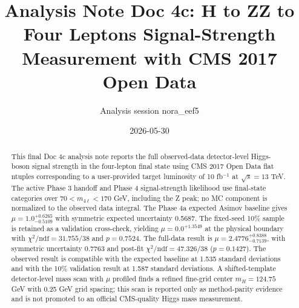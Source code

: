 \documentclass[11pt]{article}
\title{Analysis Note Doc 4c: H to ZZ to Four Leptons Signal-Strength Measurement with CMS 2017 Open Data}
\author{Analysis session nora\_eef5}
\date{2026-05-30}
\begin{document}
\maketitle
\begin{abstract}
This final Doc 4c analysis note reports the full observed-data detector-level Higgs-boson signal strength in the four-lepton final state using CMS 2017 Open Data flat ntuples corresponding to a user-provided target luminosity of 10 fb$^{-1}$ at $\sqrt{s}=13$ TeV.
The active Phase 3 handoff and Phase 4 signal-strength likelihood use final-state categories over $70 < m_{4\ell} < 170$ GeV, including the Z peak; no MC component is normalized to the observed data integral.
The Phase 4a expected Asimov baseline gives $\mu=1.0^{+0.6265}_{-0.5109}$ with symmetric expected uncertainty 0.5687.
The fixed-seed 10\% sample is retained as a validation cross-check, yielding $\mu=0.0^{+1.3549}$ at the physical boundary with $\chi^2/\mathrm{ndf}=31.755/38$ and $p=0.7524$.
The full-data result is $\mu=2.4776^{+0.8388}_{-0.7139}$, with symmetric uncertainty 0.7763 and post-fit $\chi^2/\mathrm{ndf}=47.326/38$ ($p=0.1427$). The observed result is compatible with the expected baseline at 1.535 standard deviations and with the 10\% validation result at 1.587 standard deviations.
A shifted-template detector-level mass scan with $\mu$ profiled finds a refined fine-grid center $m_H=124.75$ GeV with 0.25 GeV grid spacing; this scan is reported only as method-parity evidence and is not promoted to an official CMS-quality Higgs mass measurement.
\end{abstract}
\tableofcontents
\clearpage
\end{document}
